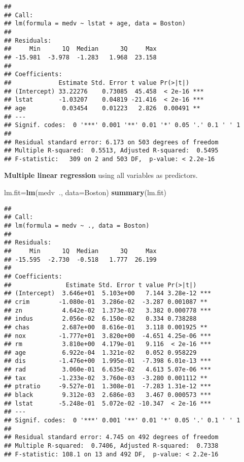 \documentclass[]{article}
\newenvironment{Shaded}{\begin{snugshade}}{\end{snugshade}}
\newcommand{\KeywordTok}[1]{\textcolor[rgb]{0.13,0.29,0.53}{\textbf{#1}}}
\newcommand{\DataTypeTok}[1]{\textcolor[rgb]{0.13,0.29,0.53}{#1}}
\newcommand{\OperatorTok}[1]{\textcolor[rgb]{0.81,0.36,0.00}{\textbf{#1}}}
\newcommand{\NormalTok}[1]{#1}
\begin{document}
\begin{verbatim}
## 
## Call:
## lm(formula = medv ~ lstat + age, data = Boston)
## 
## Residuals:
##     Min      1Q  Median      3Q     Max 
## -15.981  -3.978  -1.283   1.968  23.158 
## 
## Coefficients:
##             Estimate Std. Error t value Pr(>|t|)    
## (Intercept) 33.22276    0.73085  45.458  < 2e-16 ***
## lstat       -1.03207    0.04819 -21.416  < 2e-16 ***
## age          0.03454    0.01223   2.826  0.00491 ** 
## ---
## Signif. codes:  0 '***' 0.001 '**' 0.01 '*' 0.05 '.' 0.1 ' ' 1
## 
## Residual standard error: 6.173 on 503 degrees of freedom
## Multiple R-squared:  0.5513, Adjusted R-squared:  0.5495 
## F-statistic:   309 on 2 and 503 DF,  p-value: < 2.2e-16
\end{verbatim}

\textbf{Multiple linear regression} using all variables as predictors.

\begin{Shaded}
\begin{Highlighting}[]
\NormalTok{lm.fit=}\KeywordTok{lm}\NormalTok{(medv}\OperatorTok{~}\NormalTok{., }\DataTypeTok{data=}\NormalTok{Boston)}
\KeywordTok{summary}\NormalTok{(lm.fit)}
\end{Highlighting}
\end{Shaded}

\begin{verbatim}
## 
## Call:
## lm(formula = medv ~ ., data = Boston)
## 
## Residuals:
##     Min      1Q  Median      3Q     Max 
## -15.595  -2.730  -0.518   1.777  26.199 
## 
## Coefficients:
##               Estimate Std. Error t value Pr(>|t|)    
## (Intercept)  3.646e+01  5.103e+00   7.144 3.28e-12 ***
## crim        -1.080e-01  3.286e-02  -3.287 0.001087 ** 
## zn           4.642e-02  1.373e-02   3.382 0.000778 ***
## indus        2.056e-02  6.150e-02   0.334 0.738288    
## chas         2.687e+00  8.616e-01   3.118 0.001925 ** 
## nox         -1.777e+01  3.820e+00  -4.651 4.25e-06 ***
## rm           3.810e+00  4.179e-01   9.116  < 2e-16 ***
## age          6.922e-04  1.321e-02   0.052 0.958229    
## dis         -1.476e+00  1.995e-01  -7.398 6.01e-13 ***
## rad          3.060e-01  6.635e-02   4.613 5.07e-06 ***
## tax         -1.233e-02  3.760e-03  -3.280 0.001112 ** 
## ptratio     -9.527e-01  1.308e-01  -7.283 1.31e-12 ***
## black        9.312e-03  2.686e-03   3.467 0.000573 ***
## lstat       -5.248e-01  5.072e-02 -10.347  < 2e-16 ***
## ---
## Signif. codes:  0 '***' 0.001 '**' 0.01 '*' 0.05 '.' 0.1 ' ' 1
## 
## Residual standard error: 4.745 on 492 degrees of freedom
## Multiple R-squared:  0.7406, Adjusted R-squared:  0.7338 
## F-statistic: 108.1 on 13 and 492 DF,  p-value: < 2.2e-16
\end{verbatim}
\end{document}
